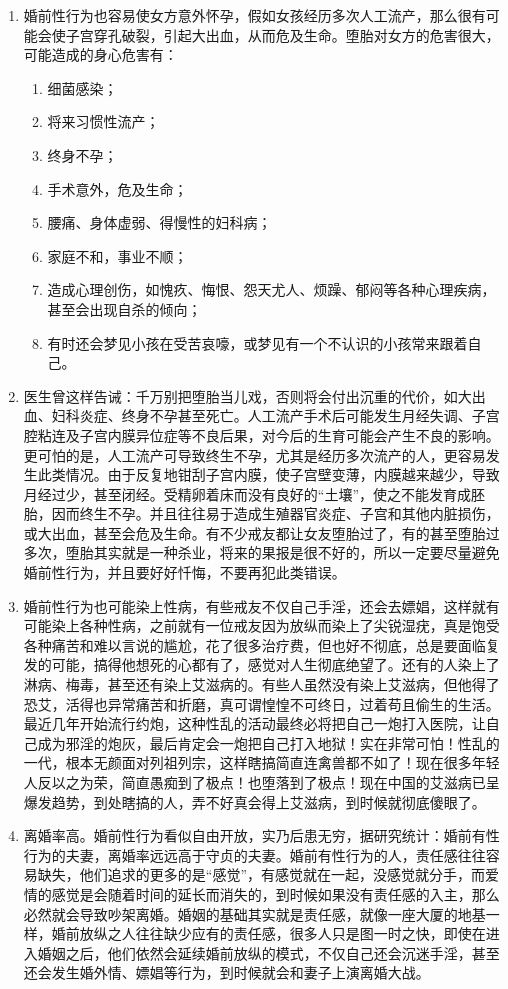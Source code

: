 \documentclass[fontset=founder]{ctexart}
\begin{document}
\begin{enumerate}
    \item 婚前性行为也容易使女方意外怀孕，假如女孩经历多次人工流产，那么很有可能会使子宫穿孔破裂，引起大出血，从而危及生命。堕胎对女方的危害很大，可能造成的身心危害有：\begin{enumerate}
              \item 细菌感染；
              \item 将来习惯性流产；
              \item 终身不孕；
              \item 手术意外，危及生命；
              \item 腰痛、身体虚弱、得慢性的妇科病；
              \item 家庭不和，事业不顺；
              \item 造成心理创伤，如愧疚、悔恨、怨天尤人、烦躁、郁闷等各种心理疾病，甚至会出现自杀的倾向；
              \item 有时还会梦见小孩在受苦哀嚎，或梦见有一个不认识的小孩常来跟着自己。
          \end{enumerate}
    \item 医生曾这样告诫：千万别把堕胎当儿戏，否则将会付出沉重的代价，如大出血、妇科炎症、终身不孕甚至死亡。人工流产手术后可能发生月经失调、子宫腔粘连及子宫内膜异位症等不良后果，对今后的生育可能会产生不良的影响。更可怕的是，人工流产可导致终生不孕，尤其是经历多次流产的人，更容易发生此类情况。由于反复地钳刮子宫内膜，使子宫壁变薄，内膜越来越少，导致月经过少，甚至闭经。受精卵着床而没有良好的“土壤”，使之不能发育成胚胎，因而终生不孕。并且往往易于造成生殖器官炎症、子宫和其他内脏损伤，或大出血，甚至会危及生命。有不少戒友都让女友堕胎过了，有的甚至堕胎过多次，堕胎其实就是一种杀业，将来的果报是很不好的，所以一定要尽量避免婚前性行为，并且要好好忏悔，不要再犯此类错误。
    \item 婚前性行为也可能染上性病，有些戒友不仅自己手淫，还会去嫖娼，这样就有可能染上各种性病，之前就有一位戒友因为放纵而染上了尖锐湿疣，真是饱受各种痛苦和难以言说的尴尬，花了很多治疗费，但也好不彻底，总是要面临复发的可能，搞得他想死的心都有了，感觉对人生彻底绝望了。还有的人染上了淋病、梅毒，甚至还有染上艾滋病的。有些人虽然没有染上艾滋病，但他得了恐艾，活得也异常痛苦和折磨，真可谓惶惶不可终日，过着苟且偷生的生活。最近几年开始流行约炮，这种性乱的活动最终必将把自己一炮打入医院，让自己成为邪淫的炮灰，最后肯定会一炮把自己打入地狱！实在非常可怕！性乱的一代，根本无颜面对列祖列宗，这样瞎搞简直连禽兽都不如了！现在很多年轻人反以之为荣，简直愚痴到了极点！也堕落到了极点！现在中国的艾滋病已呈爆发趋势，到处瞎搞的人，弄不好真会得上艾滋病，到时候就彻底傻眼了。
    \item 离婚率高。婚前性行为看似自由开放，实乃后患无穷，据研究统计：婚前有性行为的夫妻，离婚率远远高于守贞的夫妻。婚前有性行为的人，责任感往往容易缺失，他们追求的更多的是“感觉”，有感觉就在一起，没感觉就分手，而爱情的感觉是会随着时间的延长而消失的，到时候如果没有责任感的入主，那么必然就会导致吵架离婚。婚姻的基础其实就是责任感，就像一座大厦的地基一样，婚前放纵之人往往缺少应有的责任感，很多人只是图一时之快，即使在进入婚姻之后，他们依然会延续婚前放纵的模式，不仅自己还会沉迷手淫，甚至还会发生婚外情、嫖娼等行为，到时候就会和妻子上演离婚大战。
\end{enumerate}
\end{document}
